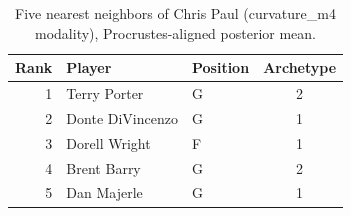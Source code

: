 \begin{table}[htbp]
  \centering\small
  \begin{tabular}{rllc}
    \toprule
    Rank & Player & Position & Archetype \\
    \midrule
    1 & Terry Porter & G & 2 \\
    2 & Donte DiVincenzo & G & 1 \\
    3 & Dorell Wright & F & 1 \\
    4 & Brent Barry & G & 2 \\
    5 & Dan Majerle & G & 1 \\
    \bottomrule
  \end{tabular}
  \caption{Five nearest neighbors of Chris Paul (curvature_m4 modality), Procrustes-aligned posterior mean.}
  \label{tab:Chris_Paul_neighbors_curvature_m4}
\end{table}

